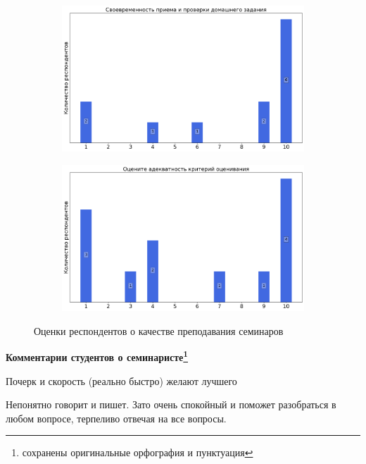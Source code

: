 \begin{figure}[H]
\begin{subfigure}[b]{0.45\textwidth}
                \includegraphics[width=\textwidth]{images/1 course/Аналитическая геометрия/seminarists-marks-Умнов Е.А.-2.png}
            \end{subfigure}
            \begin{subfigure}[b]{0.45\textwidth}
                \centering
                \includegraphics[width=\textwidth]{images/1 course/Аналитическая геометрия/seminarists-marks-Умнов Е.А.-3.png}
            \end{subfigure}	
            \caption{Оценки респондентов о качестве преподавания семинаров}
        \end{figure}

        \textbf{Комментарии студентов о семинаристе\protect\footnote{сохранены оригинальные орфография и пунктуация}}
            \begin{commentbox} 
                Почерк и скорость (реально быстро) желают лучшего 
            \end{commentbox} 
        
            \begin{commentbox} 
                Непонятно говорит и пишет. Зато очень спокойный и поможет разобраться в любом вопросе, терпеливо отвечая на все вопросы. 
            \end{commentbox} 
        
